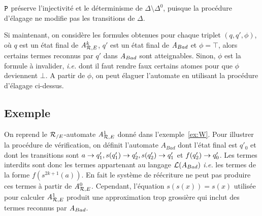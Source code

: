 \begin{remark}
   $\mathtt{P}$ préserve l'injectivité et le déterminisme de $\Delta \setminus \Delta^0$,
   puisque la procédure d'élagage ne modifie pas les transitions de $\Delta$.
 \end{remark}


Si maintenant, on considère les formules obtenues 
pour chaque triplet $(q,q',\phi)$, où $q$ est un état final de
${\mathit A}_{\mathcal R,E}^k$, $q'$ est un état final de $\mathit A_{Bad}$ et $\phi = \top$, alors
certains termes reconnus par $q'$ dans $\mathit A_{Bad}$ sont atteignables.
Sinon, $\phi$ est la formule à invalider, \textit{i.e.} dont il faut rendre faux
certains atomes pour que $\phi$ deviennent $\bot$. A partir de $\phi$, on peut
élaguer l'automate en utilisant la procédure d'élagage ci-dessus.


\subsection{Exemple}
On reprend le ${\mathcal R_{/E}}$-automate ${\mathit A}_{\mathcal R,E}^1$ donné dans l'exemple~\ref{ex:W}.
Pour illustrer la procédure de vérification, on définit l'automate
$A_{Bad}$ dont l'état final est $q'_0$ et dont les transitions sont
 $a\rightarrow q'_1, s(q'_1)\rightarrow q'_2, s(q'_2)\rightarrow q'_1$ et $f(q'_2)\rightarrow q'_0$. 
Les termes interdits sont donc les termes appartenant au langage
$\mathcal{L}(A_{Bad})$ \textit{i.e.} les termes de la forme  $f(s^{2k + 1}(a))$.
En fait le système de réécriture ne peut pas produire ces termes 
à partir de ${\mathit A}_{\mathcal R,E}^0$. Cependant, l'équation $s(s(x))=s(x)$ 
utilisée pour calculer ${\mathit A}_{\mathcal R,E}^1$ produit une approximation trop grossière
qui inclut des termes reconnus par $\mathit A_{Bad}$.

